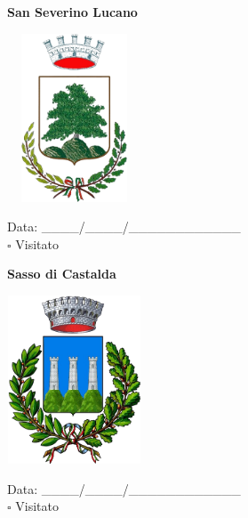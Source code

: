 \documentclass[a5paper,12pt]{article}
\begin{document}
\newpage

\noindent
\begin{minipage}[t]{0.45\textwidth}
    \begin{center}
        \textbf{San Severino Lucano}
    \end{center}
    \vspace{-0.5cm} %
    \begin{center}
        \includegraphics[height= 5cm, width=4cm]{Basilicata/San_Severino_Lucano-Stemma.png}
    \end{center}
    \vspace{-0.4cm} %
    \begin{flushleft}
        Data: \_\_\_\_/\_\_\_\_/\_\_\_\_\_\_\_\_\_\_\_\_ \\
        $\square$ Visitato
    \end{flushleft}
\end{minipage}
\hfill
\noindent
\begin{minipage}[t]{0.45\textwidth}
    \begin{center}
        \textbf{Sasso di Castalda}
    \end{center}
    \vspace{-0.4cm} %
    \begin{center}
        \includegraphics[height= 5cm, width=4cm]{Basilicata/Sasso_di_Castalda-Stemma.png}
    \end{center}
    \vspace{-0.5cm} %
    \begin{flushleft}
        Data: \_\_\_\_/\_\_\_\_/\_\_\_\_\_\_\_\_\_\_\_\_ \\
        $\square$ Visitato
    \end{flushleft}
\end{minipage}
\hfill
\end{document}
